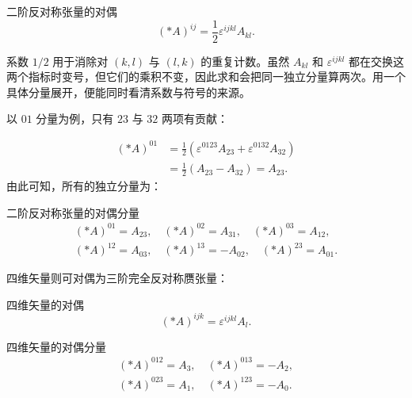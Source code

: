 \documentclass[a4paper,12pt]{article}
\begin{document}
\begin{definitionBox}{二阶反对称张量的对偶}
\begin{equation}\label{dual-two}
(*A)^{ij}=\frac12\varepsilon^{ijkl}A_{kl}.
\end{equation}
\end{definitionBox}

系数 $1/2$ 用于消除对 $(k,l)$ 与 $(l,k)$ 的重复计数。虽然 $A_{kl}$ 和 $\varepsilon^{ijkl}$ 都在交换这两个指标时变号，但它们的乘积不变，因此求和会把同一独立分量算两次。用一个具体分量展开，便能同时看清系数与符号的来源。

以 $01$ 分量为例，只有 $23$ 与 $32$ 两项有贡献：

\begin{equation}\label{dual-example}
\begin{aligned}(*A)^{01}&=\tfrac12(\varepsilon^{0123}A_{23}+\varepsilon^{0132}A_{32})\\&=\tfrac12(A_{23}-A_{32})=A_{23}.\end{aligned}
\end{equation}
由此可知，所有的独立分量为：

\begin{resultBox}{二阶反对称张量的对偶分量}
\begin{equation}\label{dual-components}
\begin{gathered}(*A)^{01}=A_{23},\quad (*A)^{02}=A_{31},\quad (*A)^{03}=A_{12},\\(*A)^{12}=A_{03},\quad (*A)^{13}=-A_{02},\quad (*A)^{23}=A_{01}.\end{gathered}
\end{equation}
\end{resultBox}
四维矢量则可对偶为三阶完全反对称赝张量：

\begin{definitionBox}{四维矢量的对偶}
\begin{equation}\label{dual-three}
(*A)^{ijk}=\varepsilon^{ijkl}A_l.
\end{equation}
\end{definitionBox}

\begin{resultBox}{四维矢量的对偶分量}
\begin{equation}\label{dual-vector}
\begin{gathered}(*A)^{012}=A_3,\quad (*A)^{013}=-A_2,\\(*A)^{023}=A_1,\quad (*A)^{123}=-A_0.\end{gathered}
\end{equation}
\end{resultBox}
\end{document}
